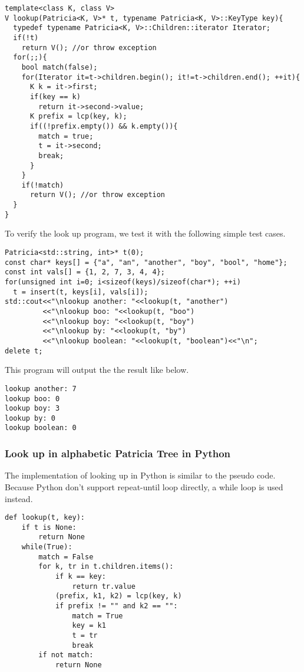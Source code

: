 \documentclass{article}
\begin{document}
\lstset{language=C++}
\begin{lstlisting}
template<class K, class V>
V lookup(Patricia<K, V>* t, typename Patricia<K, V>::KeyType key){
  typedef typename Patricia<K, V>::Children::iterator Iterator;
  if(!t)
    return V(); //or throw exception
  for(;;){
    bool match(false);
    for(Iterator it=t->children.begin(); it!=t->children.end(); ++it){
      K k = it->first;
      if(key == k)
        return it->second->value;
      K prefix = lcp(key, k);
      if((!prefix.empty()) && k.empty()){
        match = true;
        t = it->second;
        break;
      }
    }
    if(!match)
      return V(); //or throw exception
  }
}
\end{lstlisting}

To verify the look up program, we test it with the following simple
test cases.

\begin{lstlisting}
Patricia<std::string, int>* t(0);
const char* keys[] = {"a", "an", "another", "boy", "bool", "home"};
const int vals[] = {1, 2, 7, 3, 4, 4};
for(unsigned int i=0; i<sizeof(keys)/sizeof(char*); ++i)
  t = insert(t, keys[i], vals[i]);
std::cout<<"\nlookup another: "<<lookup(t, "another")
         <<"\nlookup boo: "<<lookup(t, "boo")
         <<"\nlookup boy: "<<lookup(t, "boy")
         <<"\nlookup by: "<<lookup(t, "by")
         <<"\nlookup boolean: "<<lookup(t, "boolean")<<"\n";
delete t;
\end{lstlisting}

This program will output the the result like below.

\begin{verbatim}
lookup another: 7
lookup boo: 0
lookup boy: 3
lookup by: 0
lookup boolean: 0
\end{verbatim}

\subsubsection*{Look up in alphabetic Patricia Tree in Python}
The implementation of looking up in Python is similar to the pseudo code.
Because Python don't support repeat-until loop directly, a while loop is
used instead.

\lstset{language=Python}
\begin{lstlisting}
def lookup(t, key):
    if t is None:
        return None
    while(True):
        match = False
        for k, tr in t.children.items():
            if k == key:
                return tr.value
            (prefix, k1, k2) = lcp(key, k)
            if prefix != "" and k2 == "":
                match = True
                key = k1
                t = tr
                break
        if not match:
            return None
\end{lstlisting}
\end{document}
